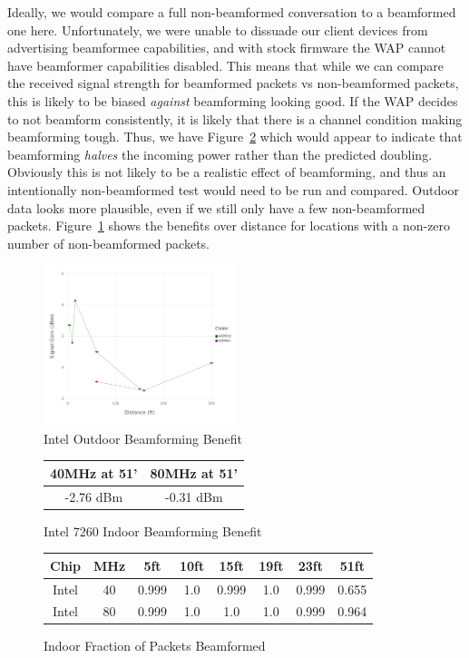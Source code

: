 Ideally, we would compare a full non-beamformed conversation to a
beamformed one here. Unfortunately, we were unable to dissuade our
client devices from advertising beamformee capabilities, and with
stock firmware the WAP cannot have beamformer capabilities disabled.
This means that while we can compare the received signal strength for
beamformed packets vs non-beamformed packets, this is likely to be
biased \emph{against} beamforming looking good. If the WAP decides to
not beamform consistently, it is likely that there is a channel
condition making beamforming tough. Thus, we have Figure~\ref{fig:intelindoorbeamresult}
which would appear to indicate that beamforming \emph{halves} the
incoming power rather than the predicted doubling. Obviously this is
not likely to be a realistic effect of beamforming, and thus an
intentionally non-beamformed test would need to be run and
compared. Outdoor data looks more plausible, even if we still only
have a few non-beamformed
packets. Figure~\ref{fig:inteloutdoorbeambenefit} shows the benefits
over distance for locations with a non-zero number of non-beamformed
packets.
\begin{figure}[!h]
\centering
\includegraphics[width=0.5\textwidth]{figures/Intel_Outside_Beamforming_Benefit}
\caption{Intel Outdoor Beamforming Benefit}
\label{fig:inteloutdoorbeambenefit}
\end{figure}

\begin{figure}[h!]
\centering
\begin{tabular}{| c | c |}
\hline
40MHz at 51' & 80MHz at 51'\\ \hline
-2.76 dBm &  -0.31 dBm\\ \hline
\end{tabular}
\caption{Intel 7260 Indoor Beamforming Benefit}
\label{fig:intelindoorbeamresult}
\end{figure}

\begin{figure}[b!]
\centering
\begin{tabular}{| c | c || c | c | c | c | c | c |}
\hline
Chip & MHz & 5ft & 10ft & 15ft & 19ft & 23ft & 51ft\\ \hline
Intel & 40 & 0.999 & 1.0 & 0.999 & 1.0 & 0.999 & 0.655\\ \hline
Intel & 80 & 0.999 & 1.0 & 1.0 & 1.0 & 0.999 & 0.964\\ \hline
\end{tabular}
\caption{Indoor Fraction of Packets Beamformed}
\label{fig:indoorbeampercent}
\end{figure}


